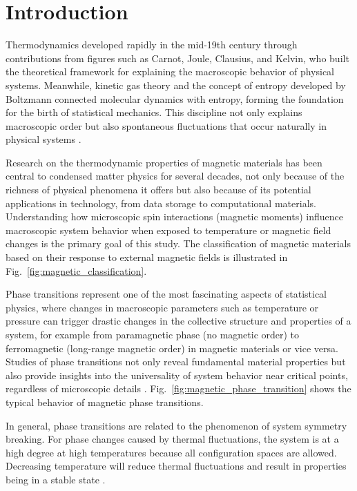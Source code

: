\section{Introduction}

Thermodynamics developed rapidly in the mid-19th century through contributions from figures such as Carnot, Joule, Clausius, and Kelvin, who built the theoretical framework for explaining the macroscopic behavior of physical systems. Meanwhile, kinetic gas theory and the concept of entropy developed by Boltzmann connected molecular dynamics with entropy, forming the foundation for the birth of statistical mechanics. This discipline not only explains macroscopic order but also spontaneous fluctuations that occur naturally in physical systems \cite{Pathria2001}.

Research on the thermodynamic properties of magnetic materials has been central to condensed matter physics for several decades, not only because of the richness of physical phenomena it offers but also because of its potential applications in technology, from data storage to computational materials. Understanding how microscopic spin interactions (magnetic moments) influence macroscopic system behavior when exposed to temperature or magnetic field changes is the primary goal of this study. The classification of magnetic materials based on their response to external magnetic fields is illustrated in Fig.~\ref{fig:magnetic_classification}.

Phase transitions represent one of the most fascinating aspects of statistical physics, where changes in macroscopic parameters such as temperature or pressure can trigger drastic changes in the collective structure and properties of a system, for example from paramagnetic phase (no magnetic order) to ferromagnetic (long-range magnetic order) in magnetic materials or vice versa. Studies of phase transitions not only reveal fundamental material properties but also provide insights into the universality of system behavior near critical points, regardless of microscopic details \cite{Tokura2019}. Fig.~\ref{fig:magnetic_phase_transition} shows the typical behavior of magnetic phase transitions.

In general, phase transitions are related to the phenomenon of system symmetry breaking. For phase changes caused by thermal fluctuations, the system is at a high degree at high temperatures because all configuration spaces are allowed. Decreasing temperature will reduce thermal fluctuations and result in properties being in a stable state \cite{Surungan2017}.

